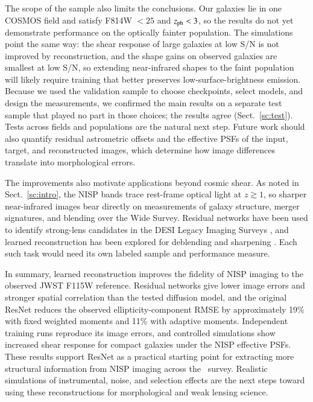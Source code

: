 \documentclass[longauth]{aa}
\begin{document}
The scope of the sample also limits the conclusions. 
Our galaxies lie in one COSMOS field and satisfy F814W $<25$ and $z_{\rm ph}<3$, so the results do not yet demonstrate performance on the optically fainter population.
The simulations point the same way: the shear response of large galaxies at low S/N is not improved by reconstruction, and the shape gains on observed galaxies are smallest at low S/N, so extending near-infrared shapes to the faint population will likely require training that better preserves low-surface-brightness emission.
Because we used the validation sample to choose checkpoints, select models, and design the measurements, we confirmed the main results on a separate test sample that played no part in those choices; the results agree (Sect.~\ref{sc:test}).
Tests across fields and populations are the natural next step.
Future work should also quantify residual astrometric offsets and the effective PSFs of the input, target, and reconstructed images, which determine how image differences translate into morphological errors.

The improvements also motivate applications beyond cosmic shear.
As noted in Sect.~\ref{sc:intro}, the NISP bands trace rest-frame optical light at $z\gtrsim1$, so sharper near-infrared images bear directly on measurements of galaxy structure, merger signatures, and blending over the Wide Survey.
Residual networks have been used to identify strong-lens candidates in the DESI Legacy Imaging Surveys \citep{Huang_et_al_2021}, and learned reconstruction has been explored for deblending and sharpening \citep{superres_1, Reiman_Gohre_2019, Arcelin2021, Hemmati2022, superres_2}.
Each such task would need its own labeled sample and performance measure.

In summary, learned reconstruction improves the fidelity of NISP imaging to the observed JWST F115W reference.
Residual networks give lower image errors and stronger spatial correlation than the tested diffusion model, and the original ResNet reduces the observed ellipticity-component RMSE by approximately 19\% with fixed weighted moments and 11\% with adaptive moments.
Independent training runs reproduce its image errors, and controlled simulations show increased shear response for compact galaxies under the NISP effective PSFs.
These results support ResNet as a practical starting point for extracting more structural information from NISP imaging across the \Euclid\ survey.
Realistic simulations of instrumental, noise, and selection effects are the next steps toward using these reconstructions for morphological and weak lensing science.
\end{document}
